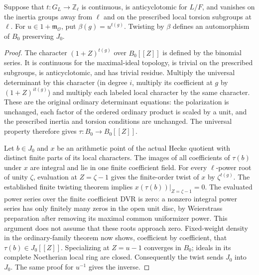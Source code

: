 \begin{lemma}
\label{lem:rh-ordinary-infinite-twist}
Suppose that $t:G_L\to\mathbb Z_\ell$ is continuous, is
anticyclotomic for $L/F$, and vanishes on the inertia groups away from
$\ell$ and on the prescribed local torsion subgroups at $\ell$.
For $u\in 1+\mathfrak m_{\mathcal O}$, put
$\beta(g)=u^{t(g)}$. Twisting by $\beta$ defines an automorphism of
$B_0$ preserving $J_0$.
\end{lemma}
\begin{proof}
The character $(1+Z)^{t(g)}$ over $B_0[[Z]]$ is defined by the binomial
series. It is continuous for the maximal-ideal topology, is trivial on
the prescribed subgroups, is anticyclotomic, and has trivial residue.
Multiply the universal determinant by this character (in degree $i$,
multiply its coefficient at $g$ by $(1+Z)^{it(g)}$) and multiply each
labeled local character by the same character. These are the original
ordinary determinant equations: the polarization is unchanged, each
factor of the ordered ordinary product is scaled by a unit, and the
prescribed inertia and torsion conditions are unchanged. The universal
property therefore gives
$\tau:B_0\to B_0[[Z]]$.

Let $b\in J_0$ and $x$ be an arithmetic point of the actual Hecke
quotient with distinct finite parts of its local characters. The images
of all coefficients of $\tau(b)$ under $x$ are integral and lie in one
finite coefficient field. For every $\ell$-power root of unity $\zeta$,
evaluation at $Z=\zeta-1$ gives the finite-order twist of $x$ by
$\zeta^{t(g)}$. The established finite twisting theorem implies
$x(\tau(b))|_{Z=\zeta-1}=0$. The evaluated power series over the finite
coefficient DVR is zero: a nonzero integral power series has only
finitely many zeros in the open unit disc, by Weierstrass preparation
after removing its maximal common uniformizer power. This argument
does not assume that these roots approach zero.
Fixed-weight density in the ordinary-family theorem now shows,
coefficient by coefficient, that $\tau(b)\in J_0[[Z]]$.
Specializing at $Z=u-1$ converges in $B_0$; ideals in its complete
Noetherian local ring are closed. Consequently the twist sends
$J_0$ into $J_0$. The same proof for $u^{-1}$ gives the inverse.
\end{proof}


